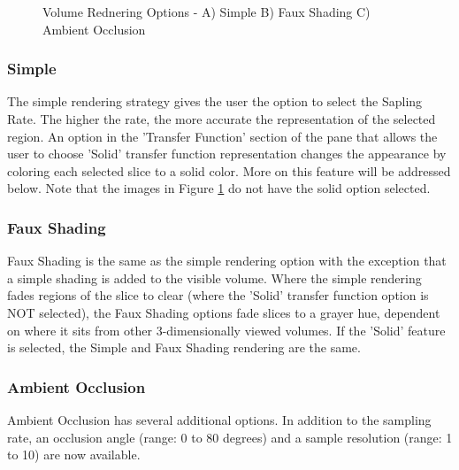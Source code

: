 \documentclass[fleqn,11pt,openany]{book}
\begin{document}
\begin{figure}[h!]
\caption{Volume Rednering Options - A) Simple B) Faux Shading C) Ambient Occlusion}\label{fig:VolRendOpt}
\end{figure}

\subsubsection{Simple}
The simple rendering strategy gives the user the option to select the Sapling Rate.
The higher the rate, the more accurate the representation of the selected region.
An option in the 'Transfer Function' section of the pane that allows the user to choose 'Solid' transfer function representation changes the appearance by coloring each selected slice to a solid color.
More on this feature will be addressed below.
Note that the images in Figure \ref{fig:VolRendOpt} do not have the solid option selected.

\subsubsection{Faux Shading}
Faux Shading is the same as the simple rendering option with the exception that a simple shading is added to the visible volume.
Where the simple rendering fades regions of the slice to clear (where the 'Solid' transfer function option is NOT selected), the Faux Shading options fade slices to a grayer hue, dependent on where it sits from other 3-dimensionally viewed volumes.
If the 'Solid' feature is selected, the Simple and Faux Shading rendering are the same.

\subsubsection{Ambient Occlusion}
Ambient Occlusion has several additional options.
In addition to the sampling rate, an occlusion angle (range: 0 to 80 degrees) and a sample resolution (range: 1 to 10) are now available.

\end{document}
